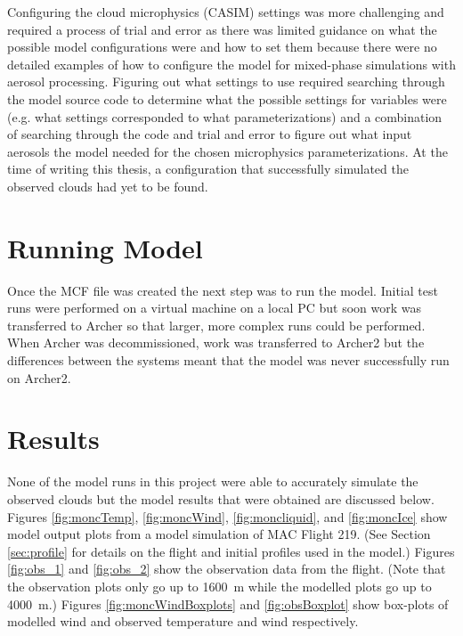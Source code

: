 Configuring the cloud microphysics (CASIM) settings was more challenging and required a process of trial and error as there was limited guidance on what the possible model configurations were and how to set them because there were no detailed examples of how to configure the model for mixed-phase simulations with aerosol processing. Figuring out what settings to use required searching through the model source code to determine what the possible settings for variables were (e.g. what settings corresponded to what parameterizations) and a combination of searching through the code and trial and error to figure out what input aerosols the model needed for the chosen microphysics parameterizations. At the time of writing this thesis, a configuration that successfully simulated the observed clouds had yet to be found. 

\section{Running Model} \label{sec:running}
Once the MCF file was created the next step was to run the model. Initial test runs were performed on a virtual machine on a local PC but soon work was transferred to Archer so that larger, more complex runs could be performed. When Archer was decommissioned, work was transferred to Archer2 but the differences between the systems meant that the model was never successfully run on Archer2.

\section{Results} \label{sec:results}
None of the model runs in this project were able to accurately simulate the observed clouds but the model results that were obtained are discussed below. Figures \ref{fig:moncTemp}, \ref{fig:moncWind}, \ref{fig:moncliquid}, and \ref{fig:moncIce} show model output plots from a model simulation of MAC Flight 219. (See Section \ref{sec:profile} for details on the flight and initial profiles used in the model.) Figures \ref{fig:obs_1} and \ref{fig:obs_2} show the observation data from the flight. (Note that the observation plots only go up to \SI{1600}{m} while the modelled plots go up to \SI{4000}{m}.) Figures \ref{fig:moncWindBoxplots} and \ref{fig:obsBoxplot} show box-plots of modelled wind and observed temperature and wind respectively.

